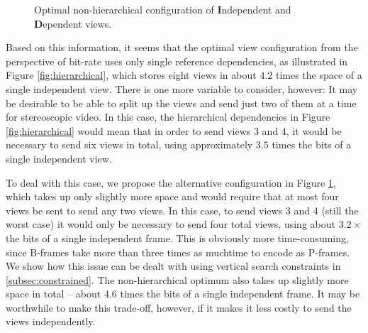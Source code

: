 \documentclass{sig-alternate-05-2015}
\begin{document}
\begin{figure}[H]
\begin{center}
\end{center}
\caption{
Optimal non-hierarchical configuration of \textbf{I}ndependent and
\textbf{D}ependent views.
}
\label{fig:optimal}
\end{figure}

Based on this information, it seems that the optimal view configuration from the
perspective of bit-rate uses only single reference dependencies, as illustrated
in Figure \ref{fig:hierarchical}, which stores eight views in about $4.2$ times
the space of a single independent view. There is one more variable to consider,
however: It may be desirable to be able to split up the views and send just two
of them at a time for stereoscopic video. In this case, the hierarchical
dependencies in Figure \ref{fig:hierarchical} would mean that in order to send
views 3 and 4, it would be necessary to send six views in total, using
approximately $3.5$ times the bits of a single independent view.

To deal with this case, we propose the alternative  configuration in Figure
\ref{fig:optimal}, which takes up only slightly more space and would require
that at most four views be sent to send any two views. In this case, to send
views 3 and 4 (still the worst case) it would only be necessary to send four
total views, using about $3.2\times$ the bits of a single independent frame.
This is obviously more time-consuming, since B-frames take more than three times
as muchtime to encode as P-frames. We show how this issue can be dealt with
using vertical search constraints in \ref{subsec:constrained}. The
non-hierarchical optimum also takes up slightly more space in total -- about 4.6
times the bits of a single independent frame. It may be worthwhile to make this
trade-off, however, if it makes it less costly to send the views independently.
\end{document}
